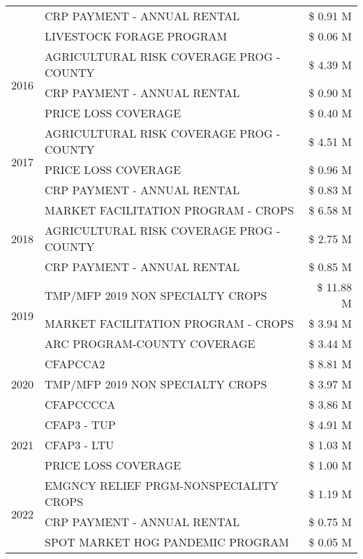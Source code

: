 \begin{tabular}{llr}
 & CRP PAYMENT - ANNUAL RENTAL & \$ 0.91 M \\
 & LIVESTOCK FORAGE PROGRAM & \$ 0.06 M \\
\cline{1-3}
\multirow[t]{3}{*}{2016} & AGRICULTURAL RISK COVERAGE PROG - COUNTY & \$ 4.39 M \\
 & CRP PAYMENT - ANNUAL RENTAL & \$ 0.90 M \\
 & PRICE LOSS COVERAGE & \$ 0.40 M \\
\cline{1-3}
\multirow[t]{3}{*}{2017} & AGRICULTURAL RISK COVERAGE PROG - COUNTY & \$ 4.51 M \\
 & PRICE LOSS COVERAGE & \$ 0.96 M \\
 & CRP PAYMENT - ANNUAL RENTAL & \$ 0.83 M \\
\cline{1-3}
\multirow[t]{3}{*}{2018} & MARKET FACILITATION PROGRAM - CROPS & \$ 6.58 M \\
 & AGRICULTURAL RISK COVERAGE PROG - COUNTY & \$ 2.75 M \\
 & CRP PAYMENT - ANNUAL RENTAL & \$ 0.85 M \\
\cline{1-3}
\multirow[t]{3}{*}{2019} & TMP/MFP 2019 NON SPECIALTY CROPS & \$ 11.88 M \\
 & MARKET FACILITATION PROGRAM - CROPS & \$ 3.94 M \\
 & ARC PROGRAM-COUNTY COVERAGE & \$ 3.44 M \\
\cline{1-3}
\multirow[t]{3}{*}{2020} & CFAPCCA2 & \$ 8.81 M \\
 & TMP/MFP 2019 NON SPECIALTY CROPS & \$ 3.97 M \\
 & CFAPCCCCA & \$ 3.86 M \\
\cline{1-3}
\multirow[t]{3}{*}{2021} & CFAP3 - TUP & \$ 4.91 M \\
 & CFAP3 - LTU & \$ 1.03 M \\
 & PRICE LOSS COVERAGE & \$ 1.00 M \\
\cline{1-3}
\multirow[t]{3}{*}{2022} & EMGNCY RELIEF PRGM-NONSPECIALITY CROPS & \$ 1.19 M \\
 & CRP PAYMENT - ANNUAL RENTAL & \$ 0.75 M \\
 & SPOT MARKET HOG PANDEMIC PROGRAM & \$ 0.05 M \\
\cline{1-3}
\bottomrule
\end{tabular}
